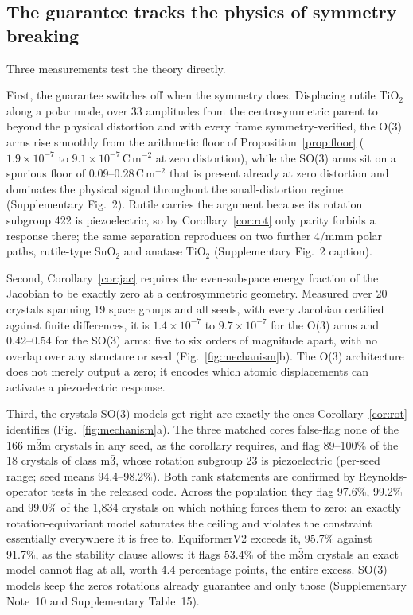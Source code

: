 \subsection*{The guarantee tracks the physics of symmetry breaking}

Three measurements test the theory directly.

First, the guarantee switches off when the symmetry does. Displacing rutile TiO$_2$ along a polar mode, over 33 amplitudes from the centrosymmetric parent to beyond the physical distortion and with every frame symmetry-verified, the O(3) arms rise smoothly from the arithmetic floor of Proposition~\ref{prop:floor} ($1.9\times10^{-7}$ to $9.1\times10^{-7}$\,C\,m$^{-2}$ at zero distortion), while the SO(3) arms sit on a spurious floor of 0.09--0.28\,C\,m$^{-2}$ that is present already at zero distortion and dominates the physical signal throughout the small-distortion regime (Supplementary Fig.~2). Rutile carries the argument because its rotation subgroup 422 is piezoelectric, so by Corollary~\ref{cor:rot} only parity forbids a response there; the same separation reproduces on two further 4/mmm polar paths, rutile-type SnO$_2$ and anatase TiO$_2$ (Supplementary Fig.~2 caption).

Second, Corollary~\ref{cor:jac} requires the even-subspace energy fraction of the Jacobian to be exactly zero at a centrosymmetric geometry. Measured over 20 crystals spanning 19 space groups and all seeds, with every Jacobian certified against finite differences, it is $1.4\times10^{-7}$ to $9.7\times10^{-7}$ for the O(3) arms and 0.42--0.54 for the SO(3) arms: five to six orders of magnitude apart, with no overlap over any structure or seed (Fig.~\ref{fig:mechanism}b). The O(3) architecture does not merely output a zero; it encodes which atomic displacements can activate a piezoelectric response.

Third, the crystals SO(3) models get right are exactly the ones Corollary~\ref{cor:rot} identifies (Fig.~\ref{fig:mechanism}a). The three matched cores false-flag none of the 166 m$\bar 3$m crystals in any seed, as the corollary requires, and flag 89--100\% of the 18 crystals of class m$\bar 3$, whose rotation subgroup 23 is piezoelectric (per-seed range; seed means 94.4--98.2\%). Both rank statements are confirmed by Reynolds-operator tests in the released code. Across the population they flag 97.6\%, 99.2\% and 99.0\% of the 1,834 crystals on which nothing forces them to zero: an exactly rotation-equivariant model saturates the ceiling and violates the constraint essentially everywhere it is free to. EquiformerV2 exceeds it, 95.7\% against 91.7\%, as the stability clause allows: it flags 53.4\% of the m$\bar 3$m crystals an exact model cannot flag at all, worth 4.4 percentage points, the entire excess. SO(3) models keep the zeros rotations already guarantee and only those (Supplementary Note~10 and Supplementary Table~15).

